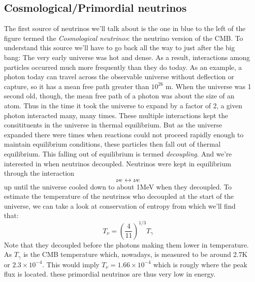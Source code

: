 \documentclass[11pt,a4paper,faculty=we,language=en,doctype=report]{cls/ugent-doc}
\begin{document}
\subsection{Cosmological/Primordial neutrinos}
The first source of neutrinos we'll talk about is the one in blue to the left of the figure
termed the \textit{Cosmological neutrinos}: 
the neutrino version of the CMB.
To understand this source we'll have to go back all the way to just after the big bang:
The very early universe was hot and dense. As a result, interactions among particles
occurred much more frequently than they do today. As an example, a photon today
can travel across the observable universe without deflection or capture, so it has a
mean free path greater than $10^{26}$ m. When the universe was 1 second old, though, 
the mean free path of a photon was about the size of an atom. Thus in
the time it took the universe to expand by a factor of 2, a given photon interacted
many, many times. These multiple interactions kept the consitituents in the universe
in thermal equilibrium. But as the universe expanded there were times when reactions could
not proceed rapidly enough to maintain equilibrium conditions, these particles then fall out
of thermal equilibrium. This falling out of equilibrium is termed \textit{decoupling}.
And we're interested in when neutrinos decoupled.
Neutrinos were kept in equilibrium through the interaction 
\begin{equation}
	\nu e \leftrightarrow \nu e
\end{equation}
up until the universe cooled down to about 1MeV when they decoupled.
To estimate the temperature of the neutrinos who decoupled at the start of the universe, 
we can take a look at conservation of entropy \cite{Dodelson} from which we'll find that:
\begin{equation}
	T_\nu = \left(\frac{4}{11}\right)^{1/3}T_\gamma
\end{equation}
Note that they decoupled before the photons making them lower in temperature.
As $T_\gamma$ is the CMB temperature which, nowadays, is measured to be around
2.7K or $2.3\times10^{-4}$. This would imply $T_\nu = 1.66\times 10^{-4}$ which
is rougly where the peak flux is located.  these primordial neutrinos are thus very
low in energy.
\end{document}
